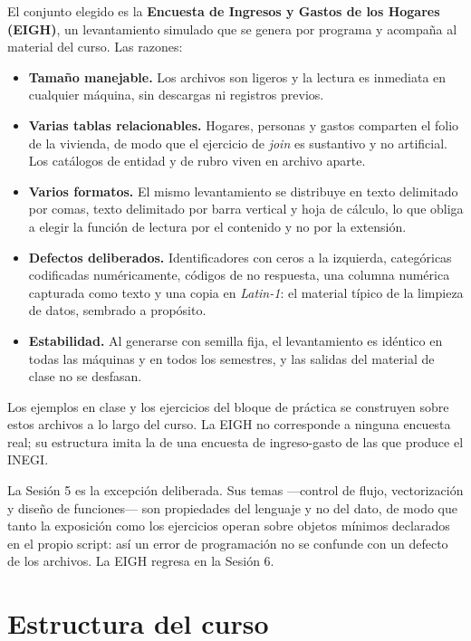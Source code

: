 \documentclass[11pt,letterpaper]{article}
\begin{document}
El conjunto elegido es la \textbf{Encuesta de Ingresos y Gastos de los Hogares (EIGH)}, un levantamiento simulado que se genera por programa y acompaña al material del curso. Las razones:

\begin{itemize}[leftmargin=*, itemsep=1pt]
    \item \textbf{Tamaño manejable.} Los archivos son ligeros y la lectura es inmediata en cualquier máquina, sin descargas ni registros previos.
    \item \textbf{Varias tablas relacionables.} Hogares, personas y gastos comparten el folio de la vivienda, de modo que el ejercicio de \textit{join} es sustantivo y no artificial. Los catálogos de entidad y de rubro viven en archivo aparte.
    \item \textbf{Varios formatos.} El mismo levantamiento se distribuye en texto delimitado por comas, texto delimitado por barra vertical y hoja de cálculo, lo que obliga a elegir la función de lectura por el contenido y no por la extensión.
    \item \textbf{Defectos deliberados.} Identificadores con ceros a la izquierda, categóricas codificadas numéricamente, códigos de no respuesta, una columna numérica capturada como texto y una copia en \textit{Latin-1}: el material típico de la limpieza de datos, sembrado a propósito.
    \item \textbf{Estabilidad.} Al generarse con semilla fija, el levantamiento es idéntico en todas las máquinas y en todos los semestres, y las salidas del material de clase no se desfasan.
\end{itemize}

Los ejemplos en clase y los ejercicios del bloque de práctica se construyen sobre estos archivos a lo largo del curso. La EIGH no corresponde a ninguna encuesta real; su estructura imita la de una encuesta de ingreso-gasto de las que produce el INEGI.

La Sesión 5 es la excepción deliberada. Sus temas —control de flujo, vectorización y diseño de funciones— son propiedades del lenguaje y no del dato, de modo que tanto la exposición como los ejercicios operan sobre objetos mínimos declarados en el propio script: así un error de programación no se confunde con un defecto de los archivos. La EIGH regresa en la Sesión 6.

\section{Estructura del curso}
\end{document}
